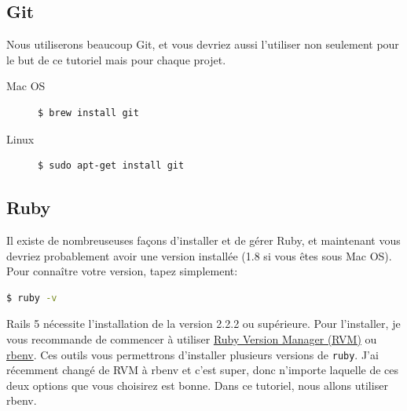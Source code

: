 \documentclass[]{report}
\begin{document}
    \subsection{Git}
      \label{setup_git}

      Nous utiliserons beaucoup Git, et vous devriez aussi l'utiliser non seulement pour le but de ce tutoriel mais pour chaque projet.

      \begin{description}
        \item[Mac OS]
          \begin{scriptsize}
          \begin{lstlisting}[language=bash]
          $ brew install git
          \end{lstlisting}
          \end{scriptsize}
        \item[Linux]
          \begin{scriptsize}
          \begin{lstlisting}[language=bash]
          $ sudo apt-get install git
          \end{lstlisting}
          \end{scriptsize}
      \end{description}

    \subsection{Ruby}

      Il existe de nombreuseuses façons d'installer et de gérer Ruby, et maintenant vous devriez probablement avoir une version installée (1.8 si vous êtes sous Mac OS). Pour connaître votre version, tapez simplement:

      \begin{scriptsize}
      \begin{lstlisting}[language=bash]
      $ ruby -v
      \end{lstlisting}
      \end{scriptsize}

      Rails 5 nécessite l'installation de la version 2.2.2 ou supérieure. Pour l'installer, je vous recommande de commencer à utiliser \href{http://rvm.io/}{Ruby Version Manager (RVM)} ou \href{http://rbenv.org/}{rbenv}. Ces outils vous permettrons d'installer plusieurs versions de \verb|ruby|. J'ai récemment changé de RVM à rbenv et c'est super, donc n'importe laquelle de ces deux options que vous choisirez est bonne. Dans ce tutoriel, nous allons utiliser rbenv.
\end{document}
